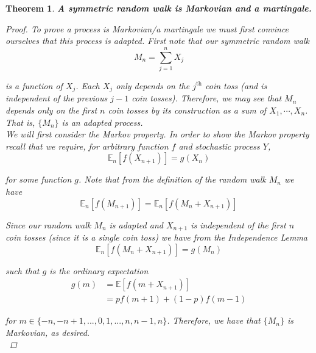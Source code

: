 \documentclass[12pt]{article}
\newtheorem{theorem}{Theorem}
\newlength\tindent
\renewcommand{\indent}{\hspace*{\tindent}}
\newcommand{\E}{\mathbb E}
\begin{document}
\begin{theorem} {\bf A symmetric random walk is Markovian and a martingale.} 

\begin{proof} To prove a process is Markovian/a martingale we must first convince ourselves that this process is adapted. First note that our symmetric random walk
\begin{equation*}
	M_n = \sum^n_{j = 1} X_j
\end{equation*}

is a function of $X_j$. Each $X_j$ only depends on the $j^\text{th}$ coin toss (and is independent of the previous $j - 1$ coin tosses). Therefore, we may see that $M_n$ depends only on the first $n$ coin tosses by its construction as a sum of $X_1,\cdots,X_n$. That is, $\{M_n\}$ is an adapted process. \\

\indent We will first consider the Markov property. In order to show the Markov property recall that we require, for arbitrary function $f$ and stochastic process $Y$,
\begin{equation*}
	\E_n[f(X_{n + 1})] = g(X_n)
\end{equation*}

for some function $g$. Note that from the definition of the random walk $M_n$ we have
\begin{equation*}
	\E_n[f(M_{n + 1})] = \E_n[f(M_n + X_{n + 1})]
\end{equation*}

\indent Since our random walk $M_n$ is adapted and $X_{n + 1}$ is independent of the first $n$ coin tosses (since it is a single coin toss) we have from the Independence Lemma
\begin{equation*}
	\E_n[f(M_n + X_{n + 1})] = g(M_n)
\end{equation*}

such that $g$ is the ordinary expectation
\begin{align*}
	g(m) &= \E[f(m + X_{n + 1})] \\
	&= pf(m + 1) + (1 - p)f(m - 1)
\end{align*}

for $m \in \{-n, -n + 1, ..., 0, 1,..., n, n - 1, n\}$. Therefore, we have that $\{M_n\}$ is Markovian, as desired. \\


\end{proof}
\end{theorem}
\end{document}
